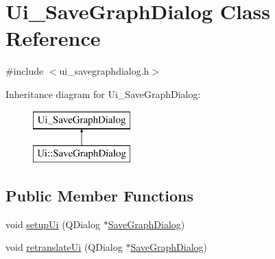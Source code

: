 \hypertarget{class_ui___save_graph_dialog}{}\section{Ui\+\_\+\+Save\+Graph\+Dialog Class Reference}
\label{class_ui___save_graph_dialog}


{\ttfamily \#include $<$ui\+\_\+savegraphdialog.\+h$>$}

Inheritance diagram for Ui\+\_\+\+Save\+Graph\+Dialog\+:\begin{figure}[H]
\begin{center}
\leavevmode
\includegraphics[height=2.000000cm]{d6/dd8/class_ui___save_graph_dialog}
\end{center}
\end{figure}
\subsection*{Public Member Functions}
\begin{DoxyCompactItemize}
\item 
void \mbox{\hyperlink{class_ui___save_graph_dialog_a2656d0cdcca1a8d5bc1ff1800b6d7e6b}{setup\+Ui}} (Q\+Dialog $\ast$\mbox{\hyperlink{class_save_graph_dialog}{Save\+Graph\+Dialog}})
\item 
void \mbox{\hyperlink{class_ui___save_graph_dialog_a7febed0434512ef44b0d43089e1b1703}{retranslate\+Ui}} (Q\+Dialog $\ast$\mbox{\hyperlink{class_save_graph_dialog}{Save\+Graph\+Dialog}})
\end{DoxyCompactItemize}
